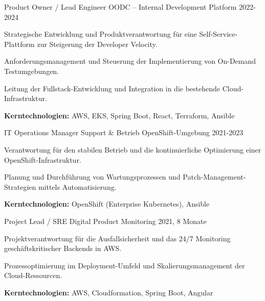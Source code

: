 \begin{cventries}
\vspace{2mm}
  \cventry
    {Product Owner / Lead Engineer} %
    {OODC – Internal Development Platform} %
    {} %
    {2022-2024} %
    {
      \begin{cvitems} %
        \item {Strategische Entwicklung und Produktverantwortung für eine Self-Service-Plattform zur Steigerung der Developer Velocity.}
        \item {Anforderungsmanagement und Steuerung der Implementierung von On-Demand Testumgebungen.}
        \item {Leitung der Fullstack-Entwicklung und Integration in die bestehende Cloud-Infrastruktur.}
        \item {\textbf{Kerntechnologien:} AWS, EKS, Spring Boot, React, Terraform, Ansible}
      \end{cvitems}
    }

\vspace{2mm}
  \cventry
    {IT Operations Manager} %
    {Support \& Betrieb OpenShift-Umgebung} %
    {} %
    {2021-2023} %
    {
      \begin{cvitems} %
        \item {Verantwortung für den stabilen Betrieb und die kontinuierliche Optimierung einer OpenShift-Infrastruktur.}
        \item {Planung und Durchführung von Wartungsprozessen und Patch-Management-Strategien mittels Automatisierung.}
        \item {\textbf{Kerntechnologien:} OpenShift (Enterprise Kubernetes), Ansible}
      \end{cvitems}
    }

\vspace{2mm}
  \cventry
    {Project Lead / SRE} %
    {Digital Product Monitoring} %
    {} %
    {2021, 8 Monate} %
    {
      \begin{cvitems} %
        \item {Projektverantwortung für die Ausfallsicherheit und das 24/7 Monitoring geschäftskritischer Backends in AWS.}
        \item {Prozessoptimierung im Deployment-Umfeld und Skalierungsmanagement der Cloud-Ressourcen.}
        \item {\textbf{Kerntechnologien:} AWS, Cloudformation, Spring Boot, Angular}
      \end{cvitems}
    }


\end{cventries}
